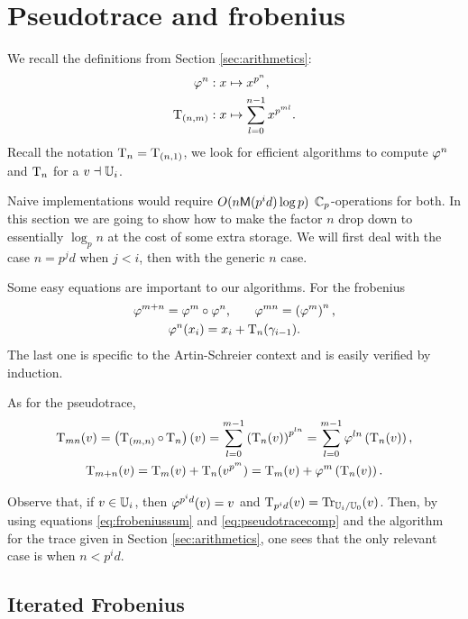 \section{Pseudotrace and frobenius}
\label{sec:pseudotrace-frobenius}
We recall the definitions from Section \ref{sec:arithmetics}:
\begin{align*}
  \varphi^n &: x \mapsto x^{p^n} \text{,}\\
  \operatorname{T}_{(n,m)} &: x \mapsto \sum_{l=0}^{n-1} x^{p^{ml}} \text{.}
\end{align*}
Recall the notation $\operatorname{T}_n = \operatorname{T}_{(n,1)}$, we look for efficient
algorithms to compute $\varphi^n$ and $\operatorname{T}_n$ for a $v\dashv\mathbb{U}_i$.

Naive implementations would require $O(n\mathrm{\sf M}(p^id)\log p)$
$\mathbb{C}_p$-operations for both. In this section we are going to show how
to make the factor $n$ drop down to essentially $\log_pn$ at the cost
of some extra storage. We will first deal with the case $n=p^jd$ when
$j<i$, then with the generic $n$ case.

Some easy equations are important to our algorithms. For the frobenius
\begin{gather}
  \label{eq:frobeniussum}
  \varphi^{m+n} = \varphi^m\circ\varphi^n \text{,}\qquad
  \varphi^{mn} = \left(\varphi^m\right)^n\text{,}\\
  \label{eq:frobenius-pseudo}
  \varphi^n(x_i) = x_i + \operatorname{T}_n(\gamma_{i-1}) \text{.}
\end{gather}
The last one is specific to the Artin-Schreier context and is easily
verified by induction.

As for the pseudotrace,
\begin{gather}
  \label{eq:pseudotracecomp}
  \operatorname{T}_{mn}(v) = \left(\operatorname{T}_{(m,n)}\circ\operatorname{T}_{n}\right)(v) =
  \sum_{l=0}^{m-1} \left(\operatorname{T}_{n}(v)\right)^{p^{ln}} =
  \sum_{l=0}^{m-1}\varphi^{ln}\left(\operatorname{T}_{n}(v)\right)
  \text{,}\\
  \label{eq:pseudotracesum}
  \operatorname{T}_{m+n}(v) = \operatorname{T}_{m}(v) + \operatorname{T}_{n}(v^{p^m}) =
  \operatorname{T}_{m}(v) + \varphi^m\left(\operatorname{T}_{n}(v)\right)\text{.}
\end{gather}

Observe that, if $v\in\mathbb{U}_i$, then $\varphi^{p^id}(v) = v$ and
$\operatorname{T}_{p^id}(v) = \operatorname{Tr}_{\mathbb{U}_i/\mathbb{U}_0}(v)$. Then, by using equations
\eqref{eq:frobeniussum} and \eqref{eq:pseudotracecomp} and the
algorithm for the trace given in Section \ref{sec:arithmetics}, one
sees that the only relevant case is when $n<p^id$.


\subsection{Iterated Frobenius}

